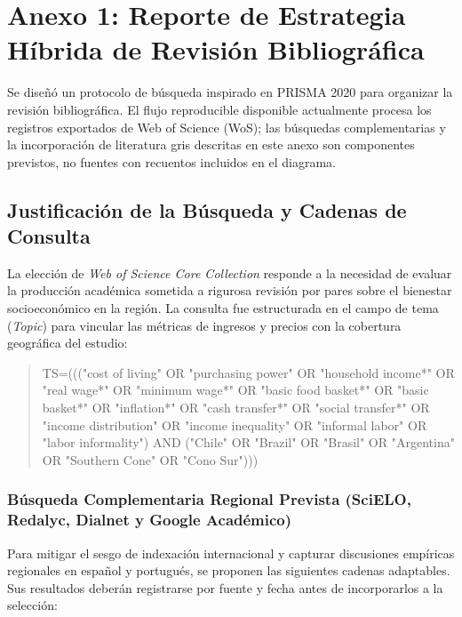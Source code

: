 \section{Anexo 1: Reporte de Estrategia Híbrida de Revisión Bibliográfica}

Se diseñó un protocolo de búsqueda inspirado en PRISMA 2020 para organizar la revisión bibliográfica. El flujo reproducible disponible actualmente procesa los registros exportados de Web of Science (WoS); las búsquedas complementarias y la incorporación de literatura gris descritas en este anexo son componentes previstos, no fuentes con recuentos incluidos en el diagrama.

\subsection{Justificación de la Búsqueda y Cadenas de Consulta}
La elección de \textit{Web of Science Core Collection} responde a la necesidad de evaluar la producción académica sometida a rigurosa revisión por pares sobre el bienestar socioeconómico en la región. La consulta fue estructurada en el campo de tema (\textit{Topic}) para vincular las métricas de ingresos y precios con la cobertura geográfica del estudio:

\begin{quote}
\small\ttfamily\raggedright
TS=((("cost of living" OR "purchasing power" OR "household income*" OR "real wage*" OR "minimum wage*" OR "basic food basket*" OR "basic basket*" OR "inflation*" OR "cash transfer*" OR "social transfer*" OR "income distribution" OR "income inequality" OR "informal labor" OR "labor informality") AND ("Chile" OR "Brazil" OR "Brasil" OR "Argentina" OR "Southern Cone" OR "Cono Sur")))
\end{quote}

\subsubsection{Búsqueda Complementaria Regional Prevista (SciELO, Redalyc, Dialnet y Google Académico)}
Para mitigar el sesgo de indexación internacional y capturar discusiones empíricas regionales en español y portugués, se proponen las siguientes cadenas adaptables. Sus resultados deberán registrarse por fuente y fecha antes de incorporarlos a la selección:

